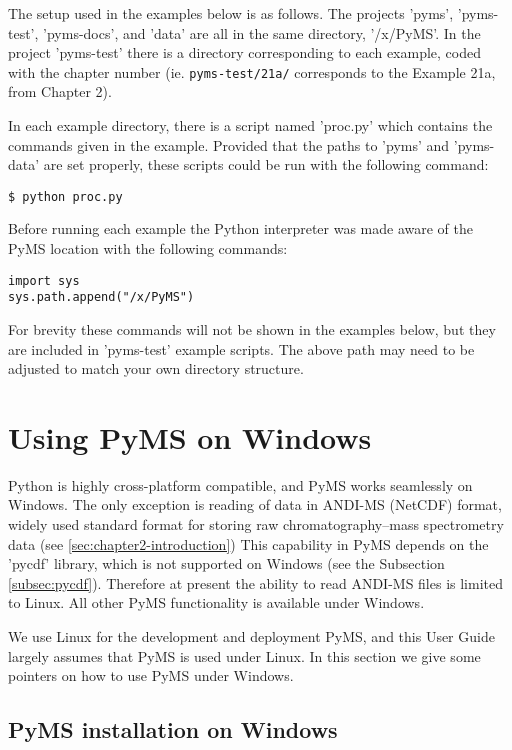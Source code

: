 The setup used in the examples below is as follows. The projects 'pyms',
'pyms-test', 'pyms-docs', and 'data' are all in the same directory,
'/x/PyMS'. In the project 'pyms-test' there is a directory corresponding
to each example, coded with the chapter number (ie. {\tt pyms-test/21a/}
corresponds to the Example 21a, from Chapter 2).

In each example directory, there is a script named 'proc.py' which
contains the commands given in the example.  Provided that the paths
to 'pyms' and 'pyms-data' are set properly, these scripts could be
run with the following command:

\begin{verbatim}
$ python proc.py
\end{verbatim}

Before running each example the Python interpreter was made aware of
the PyMS location with the following commands:

\begin{verbatim}
import sys
sys.path.append("/x/PyMS")
\end{verbatim}

For brevity these commands will not be shown in the examples below,
but they are included in 'pyms-test' example scripts.  The above
path may need to be adjusted to match your own directory structure.

\section{\label{sec:pyms-windows}Using PyMS on Windows}

Python is highly cross-platform compatible, and PyMS works seamlessly
on Windows. The only exception is reading of data in ANDI-MS (NetCDF)
format, widely used standard format for storing raw
chromatography--mass spectrometry data (see \ref{sec:chapter2-introduction})
This capability in PyMS depends on the 'pycdf' library, which is not
supported on Windows (see the Subsection \ref{subsec:pycdf}). Therefore
at present the ability to read ANDI-MS files is limited to Linux. All
other PyMS functionality is available under Windows.

We use Linux for the development and deployment PyMS, and this User
Guide largely assumes that PyMS is used under Linux. In this section
we give some pointers on how to use PyMS under Windows.

\subsection{PyMS installation on Windows}

